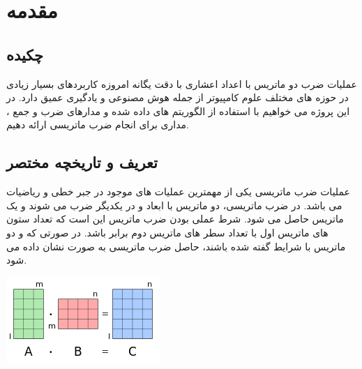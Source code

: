 \documentclass[12pt,titlepage,a4page , tikz , multi,table , svgnames,xcdraw]{article}
\begin{document}
\newpage
\pagestyle{fancy}
\fancyhf{}
\fancyfoot{}

\cfoot{\thepage}

\tableofcontents

\newpage

\section{مقدمه}

\subsection{چکیده}
عملیات ضرب دو ماتریس با اعداد اعشاری با دقت یگانه
امروزه کاربردهای بسیار زیادی در حوزه های مختلف علوم کامپیوتر از جمله هوش مصنوعی و یادگیری عمیق دارد. در این پروژه می خواهیم با استفاده از الگوریتم های داده شده و مدارهای ضرب و جمع 
، مداری برای انجام ضرب ماتریسی ارائه دهیم.


\subsection{تعریف و تاریخچه مختصر}
عملیات ضرب ماتریسی یکی از مهمترین عملیات های موجود در جبر خطی و ریاضیات می باشد. در ضرب ماتریسی، دو ماتریس با ابعاد 
و
 در یکدیگر ضرب می شوند و یک ماتریس
 حاصل می شود. شرط عملی بودن ضرب ماتریس این است که تعداد ستون های ماتریس اول با تعداد سطر های ماتریس دوم برابر باشد. در صورتی که 
و
دو ماتریس با شرایط گفته شده باشند، حاصل ضرب ماتریسی به صورت 
نشان داده می شود. \cite{wikipedia}

\begin{center}
\includegraphics[scale=1]
    {Images/Introduction/Matrix_multiplication_overview.png}\\
\end{center}
\end{document}

